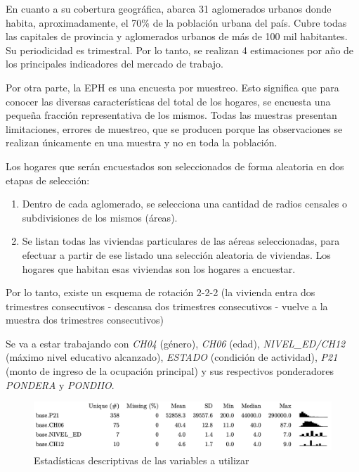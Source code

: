 \documentclass[a4paper]{article}
\theoremstyle{plain}
\theoremstyle{definition}
\begin{document}
En cuanto a su cobertura geográfica, abarca 31 aglomerados urbanos donde habita, aproximadamente, el 70\% de la población urbana del país. Cubre todas las capitales de provincia y aglomerados urbanos de más de 100 mil habitantes. Su periodicidad es trimestral. Por lo tanto, se realizan 4 estimaciones por año de los principales indicadores del mercado de trabajo.

Por otra parte, la EPH es una encuesta por muestreo. Esto significa que para conocer las diversas características del total de los hogares, se encuesta una pequeña fracción representativa de los mismos. Todas las muestras presentan limitaciones, errores de muestreo, que se producen porque las observaciones se realizan únicamente en una muestra y no en toda la población.

Los hogares que serán encuestados son seleccionados de forma aleatoria en dos etapas de selección: 
\begin{enumerate}
    \item Dentro de cada aglomerado, se selecciona una cantidad de radios censales o subdivisiones de los mismos (áreas).
    \item Se listan todas las viviendas particulares de las aéreas seleccionadas, para efectuar a partir de ese listado una selección aleatoria de viviendas. Los hogares que habitan esas viviendas son los hogares a encuestar.
\end{enumerate}   

Por lo tanto, existe un esquema de rotación 2-2-2 (la vivienda entra dos trimestres consecutivos - descansa dos trimestres consecutivos - vuelve a la muestra dos trimestres consecutivos)

Se va a estar trabajando con \textit{CH04} (género), \textit{CH06} (edad), \textit{NIVEL\_ED/CH12} (máximo nivel educativo alcanzado), \textit{ESTADO} (condición de actividad), \textit{P21} (monto de ingreso de la ocupación principal) y sus respectivos ponderadores \textit{PONDERA} y \textit{PONDIIO}. 

\begin{figure}[h]
    \centering
    \includegraphics[scale=0.5]{figuras/estadisticas_descriptivas.png}
    \caption{Estadísticas descriptivas de las variables a utilizar}
    \label{fig:kernel_ingreso_genero_nivel_ed}
\end{figure}
\end{document}

